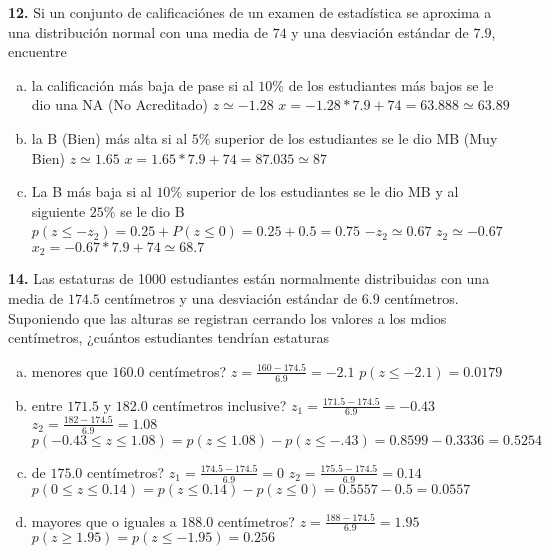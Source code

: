\documentclass[12pt, letterpaper]{article}
\begin{document}
    \textbf{12. }Si un conjunto de calificaciónes de un examen de estadística se aproxima a una distribución normal con
    una media de $74$ y una desviación estándar de $7.9$, encuentre
        \begin{enumerate}[a)]
            \item la calificación más baja de pase si al $10\%$ de los estudiantes más bajos se le dio una NA (No Acreditado)\vskip0.5cm
                $z\simeq -1.28$\vskip0.5cm
                $x=-1.28*7.9+74=63.888\simeq 63.89$\vskip0.5cm
            \item la B (Bien) más alta si al $5\%$ superior de los estudiantes se le dio MB (Muy Bien)\vskip0.5cm
                $z\simeq 1.65$\vskip0.5cm
                $x=1.65*7.9+74=87.035\simeq 87$
            \item La B más baja si al $10\%$ superior de los estudiantes se le dio MB y al siguiente $25\%$ se le dio B\vskip0.5cm
                $p(z\leq -z_2)=0.25+P(z\leq 0)=0.25+0.5=0.75$\vskip0.5cm
                $-z_2 \simeq 0.67$\vskip0.5cm
                $z_2 \simeq -0.67$\vskip0.5cm
                $x_2=-0.67*7.9+74\simeq 68.7$

        \end{enumerate}\vskip1cm

    \textbf{14. }Las estaturas de 1000 estudiantes están normalmente distribuidas con una media de $174.5$ centímetros y
    una desviación estándar de $6.9$ centímetros. Suponiendo  que las alturas se registran cerrando los valores a los mdios
    centímetros, ¿cuántos estudiantes tendrían estaturas
        \begin{enumerate}[a)]
            \item menores que $160.0$ centímetros?\vskip0.5cm
                $z=\displaystyle\frac{160-174.5}{6.9}=-2.1$\vskip0.5cm
                $p(z\leq -2.1)=0.0179$
            \item entre $171.5$ y $182.0$ centímetros inclusive?\vskip0.5cm
                $z_1=\displaystyle\frac{171.5-174.5}{6.9}=-0.43$\vskip0.5cm
                $z_2=\displaystyle\frac{182-174.5}{6.9}=1.08$\vskip0.5cm
                $p(-0.43\leq z\leq 1.08)=p(z\leq 1.08)-p(z\leq -.43)=0.8599-0.3336=0.5254$
            \item de $175.0$ centímetros?\vskip0.5cm
                $z_1=\displaystyle\frac{174.5-174.5}{6.9}=0$\vskip0.5cm
                $z_2=\displaystyle\frac{175.5-174.5}{6.9}=0.14$\vskip0.5cm
                $p(0\leq z\leq 0.14)=p(z\leq 0.14)-p(z\leq 0)=0.5557-0.5=0.0557$
            \item mayores que o iguales a $188.0$ centímetros?\vskip0.5cm
                $z=\displaystyle\frac{188-174.5}{6.9}=1.95$\vskip0.5cm
                $p(z\geq 1.95)=p(z\leq -1.95)=0.256$
        \end{enumerate}\vskip1cm
        
\end{document}
